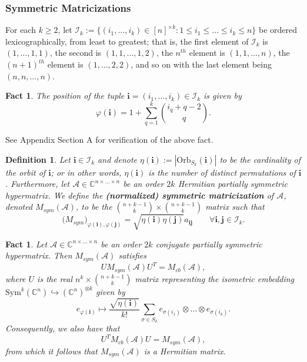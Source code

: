 \documentclass[11pt]{article}
\newtheorem{defn}[theorem]{Definition}
\newtheorem{fact}[theorem]{Fact}
\begin{document}
\subsubsection{Symmetric Matricizations}
For each $k\geq 2$, let $\mathcal{I}_k := \{(i_1,\dots,i_k)\in [n]^{\times k}:1\leq i_1\leq\dots\leq i_k\leq n\}$ be ordered lexicographically, from least to greatest; that is, the first element of $\mathcal{I}_k$ is $(1,\dots,1,1)$, the second is $(1,1,\dots,1,2)$, the $n^{th}$ element is $(1,1,\dots,n)$, the $(n+1)^{th}$ element is $(1,\dots,2,2)$, and so on with the last element being $(n,n,\dots,n)$. 
\begin{fact}\label{Position in lexicographic order}
    The position of the tuple $\mathbf{i} = (i_1,\dots,i_k)\in \mathcal{I}_k$ is given by 
    \[\varphi(\mathbf{i}) = 1+\sum\limits_{q=1}^k\binom{i_q+q-2}{q}.\]
\end{fact}
See Appendix Section A for verification of the above fact. 
\begin{defn}
    Let $\mathbf{i}\in \mathcal{I}_k$ and denote $\eta(\mathbf{i}) := |\mathrm{Orb}_{S_k}(\mathbf{i})|$ to be the cardinality of the orbit of $\mathbf{i}$; or in other words, $\eta(\mathbf{i})$ is the number of distinct permutations of $\mathbf{i}$. Furthermore, let $\mathcal{A}\in \mathbb{C}^{n\times\dots\times n}$ be an order $2k$ Hermitian partially symmetric hypermatrix. We define the \textbf{(normalized) symmetric matricization} of $\mathcal{A}$, denoted $M_{sym}(\mathcal{A})$, to be the $\binom{n+k-1}{k}\times \binom{n+k-1}{k}$ matrix such that 
    \[\big(M_{sym}\big)_{\varphi(\mathbf{i}),\varphi(\mathbf{j})} = \sqrt{\eta(\mathbf{i})\eta(\mathbf{j})}a_{\mathbf{i}\mathbf{j}}\qquad \forall \mathbf{i},\mathbf{j}\in\mathcal{I}_k.\]
\end{defn}
\begin{fact}\label{Symmetric Matricization Embedding}
    Let $\mathcal{A}\in \mathbb{C}^{n\times\dots\times n}$ be an order $2k$ conjugate partially symmetric hypermatrix. Then $M_{sym}(\mathcal{A})$ satisfies
    \[UM_{sym}(\mathcal{A})U^T = M_{cb}(\mathcal{A}),\]
    where $U$ is the real $n^k\times \binom{n+k-1}{k}$ matrix representing the isometric embedding $\mathrm{Sym}^k(\mathbb{C}^n)\hookrightarrow (\mathbb{C}^{n})^{\otimes k}$ given by 
    \[e_{\varphi(\mathbf{i})}\mapsto \frac{\sqrt{\eta(\mathbf{i})}}{k!}\sum\limits_{\sigma\in S_k}e_{\sigma(i_1)}\otimes\dots\otimes e_{\sigma(i_k)}.\]
    Consequently, we also have that 
    \[U^TM_{cb}(\mathcal{A})U = M_{sym}(\mathcal{A}),\]
    from which it follows that $M_{sym}(\mathcal{A})$ is a Hermitian matrix.  
\end{fact}
\end{document}
